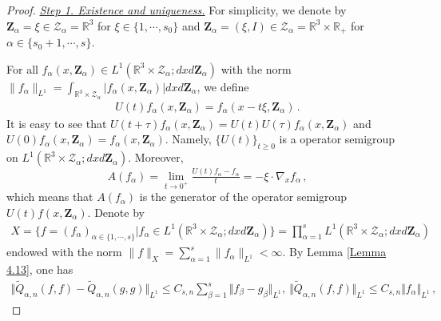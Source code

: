 \documentclass[reqno,11pt]{amsart}
\numberwithin{equation}{section}
\def\R{\mathbb{R}}
\begin{document}
\begin{proof}

\underline{\em Step 1. Existence and uniqueness.} For simplicity, we denote by $\mathbf{Z}_\alpha = \xi \in \mathcal{Z}_\alpha = \R^3$ for $\xi \in \{ 1, \cdots, s_0 \}$ and $\mathbf{Z}_\alpha = (\xi, I) \in \mathcal{Z}_\alpha = \R^3 \times \R_+$ for $\alpha \in \{ s_0 + 1, \cdots, s \}$.

For all $f_\alpha (x,\mathbf{Z}_\alpha) \in L^1(\R^3 \times \mathcal{Z}_\alpha ; d x d \mathbf{Z}_\alpha)$ with the norm $\| f_\alpha \|_{L^1} = \int_{\R^3 \times \mathcal{Z}_\alpha} |f_\alpha (x, \mathbf{Z}_\alpha)| d x d \mathbf{Z}_\alpha$, we define
\begin{equation*}
  \begin{aligned}
    U (t) f_\alpha (x, \mathbf{Z}_\alpha) = f_\alpha ( x - t \xi, \mathbf{Z}_\alpha ) \,.
  \end{aligned}
\end{equation*}
It is easy to see that $ U (t + \tau) f_\alpha (x, \mathbf{Z}_\alpha) = U (t) U (\tau) f_\alpha (x, \mathbf{Z}_\alpha) $ and $U (0) f_\alpha (x, \mathbf{Z}_\alpha) = f_\alpha (x, \mathbf{Z}_\alpha)$. Namely, $\{U(t)\}_{t\geq 0}$ is a operator semigroup on $L^1(\R^3 \times \mathcal{Z}_\alpha ;  d x d \mathbf{Z}_\alpha)$. Moreover,
	\begin{equation*}
		A(f_\alpha)=\lim \limits_{t\rightarrow 0^+ } \tfrac{U(t) f_\alpha - f_\alpha }{t} =-\xi \cdot \nabla_x f_\alpha \,,
	\end{equation*}
which means that $A(f_\alpha)$ is the generator of the operator semigroup $U(t)f(x,\mathbf{Z}_\alpha)$. Denote by
\begin{equation*}
  \begin{aligned}
    X = \{ f = (f_\alpha)_{\alpha \in \{ 1, \cdots, s \}} | f_\alpha \in L^1(\R^3 \times \mathcal{Z}_\alpha ; d x d \mathbf{Z}_\alpha) \} = \prod_{\alpha = 1}^{s} L^1(\R^3 \times \mathcal{Z}_\alpha ; d x d \mathbf{Z}_\alpha) 
  \end{aligned}
\end{equation*}
endowed with the norm $ \| f \|_X = \sum_{\alpha = 1}^{s} \| f_\alpha \|_{L^1} < \infty $. By Lemma \ref{Lemma 4.13}, one has
	\begin{equation*}
		\begin{aligned}
			\Vert \tilde{Q}_{\alpha ,n}(f,f) - \tilde{Q}_{\alpha ,n} (g,g) \Vert_{L^1} \leq C_{s,n} \sum_{\beta = 1}^s \Vert f_\beta -g_\beta \Vert_{L^1},\ \Vert \tilde{Q}_{\alpha ,n}(f,f) \Vert_{L^1} \leq C_{s,n} \Vert f_\alpha \Vert_{L^1} \,,

\end{aligned}
\end{equation*}
\end{proof}
\end{document}
